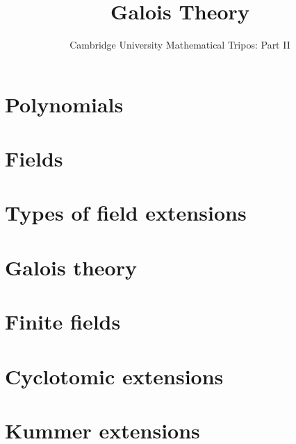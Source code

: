 \documentclass{article}
\title{Galois Theory}
\author{Cambridge University Mathematical Tripos: Part II}
\begin{document}
\maketitle

\tableofcontentsnewpage{}

\section{Polynomials}

\section{Fields}

\section{Types of field extensions}

\section{Galois theory}

\section{Finite fields}

\section{Cyclotomic extensions}

\section{Kummer extensions}

\end{document}
